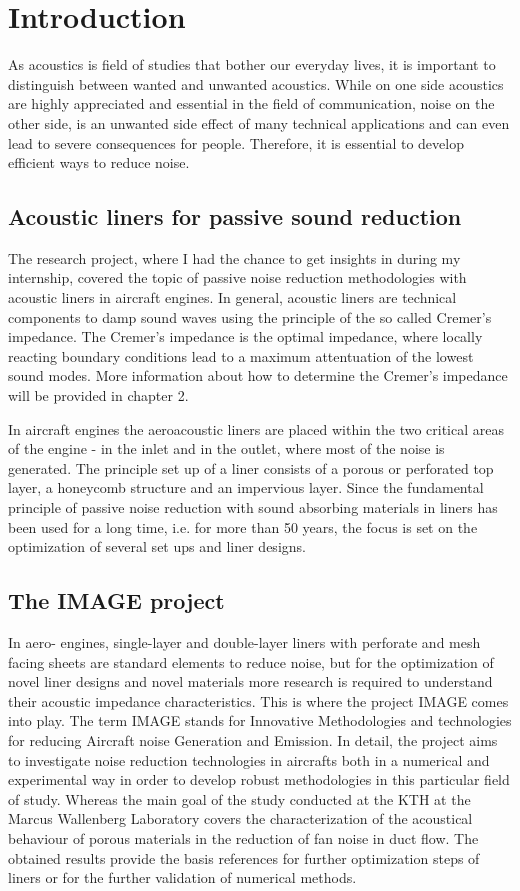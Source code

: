 \documentclass[11pt]{report} %
\begin{document}
\chapter{Introduction} 
As acoustics is field of studies that bother our everyday lives, it is important to distinguish between wanted and unwanted acoustics.
While on one side acoustics are highly appreciated and essential in the field of communication, noise on the other side, is an unwanted side effect of many technical applications and can even lead to severe consequences for people.
Therefore, it is essential to develop efficient ways to reduce noise.

\section{Acoustic liners for passive sound reduction}
The research project, where I had the chance to get insights in during my internship, covered the topic of passive noise reduction methodologies with acoustic liners in aircraft engines.
In general, acoustic liners are technical components to damp sound waves using the principle of the so called Cremer's impedance. 
The Cremer's impedance is the optimal impedance, where locally reacting boundary conditions lead to a maximum attentuation of the lowest sound modes. \cite{Elnady2004} 
More information about how to determine the Cremer's impedance will be provided in chapter 2.   

In aircraft engines the aeroacoustic liners are placed within the two critical areas of the engine - in the inlet and in the outlet, where most of the noise is generated. 	 
The principle set up of a liner consists of a porous or perforated top layer, a honeycomb structure and an impervious layer. 
Since the fundamental principle of passive noise reduction with sound absorbing materials in liners has been used for a long time, i.e. for more than 50 years, the focus is set on the optimization of several set ups and liner designs.

\section{The IMAGE project} 
In aero- engines, single-layer and double-layer liners with perforate and mesh facing sheets are standard elements to reduce noise, but for the optimization of novel liner designs and novel materials more research is required to understand their acoustic impedance characteristics.
This is where the project IMAGE comes into play.
The term IMAGE stands for Innovative Methodologies and technologies for reducing Aircraft noise Generation and Emission.
In detail, the project aims to investigate noise reduction technologies in aircrafts both in a numerical and experimental way in order to develop robust methodologies in this particular field of study.  
Whereas the main goal of the study conducted at the KTH at the Marcus Wallenberg Laboratory covers the characterization of the acoustical behaviour of porous materials in the reduction of fan noise in duct flow. 
The obtained results provide the basis references for further optimization steps of liners or for the further validation of numerical methods. 
\end{document}
